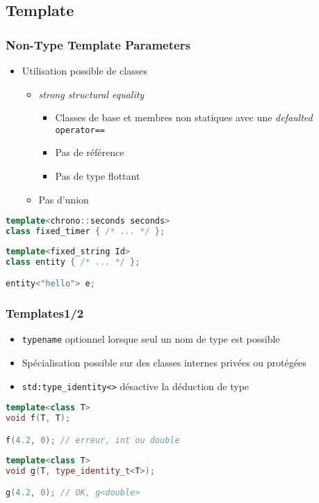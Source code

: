 \documentclass[C++.tex]{subfiles}
\begin{document}
\subsection*{Template}
\begin{frame}[fragile]
	\frametitle{Non-Type Template Parameters}
	\begin{itemize}
		\item Utilisation possible de classes
		\begin{itemize}
			\item \textit{strong structural equality}
			\begin{itemize}
				\item Classes de base et membres non statiques avec une \textit{defaulted} \lstinline|operator==|
				\item Pas de référence
				\item Pas de type flottant
			\end{itemize}
			\item Pas d'union
		\end{itemize}
	\end{itemize}

	\begin{lstlisting}[language=C++]
template<chrono::seconds seconds>
class fixed_timer { /* ... */ };\end{lstlisting}


	\begin{lstlisting}[language=C++]
template<fixed_string Id>
class entity { /* ... */ };

entity<"hello"> e;\end{lstlisting}

\end{frame}

\begin{frame}[fragile]
	\frametitle{Templates\titlehfill{}1/2}
	\begin{itemize}
		\item \lstinline|typename| optionnel lorsque seul un nom de type est possible
		

		\item Spécialisation possible sur des classes internes privées ou protégées
		\item \lstinline|std:type_identity<>| désactive la déduction de type
	\end{itemize}

	\begin{lstlisting}[language=C++]
template<class T>
void f(T, T);

f(4.2, 0); // erreur, int ou double\end{lstlisting}

	\begin{lstlisting}[language=C++]
template<class T>
void g(T, type_identity_t<T>);

g(4.2, 0); // OK, g<double>\end{lstlisting}
\end{frame}
\end{document}
